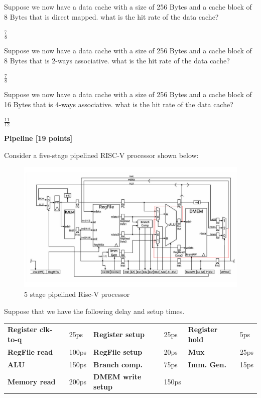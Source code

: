 \documentclass[addpoints, 12pt, answers]{exam}
\begin{document}
\begin{questions}
\begin{parts}
        Suppose we now have a data cache with a size of 256 Bytes and a cache block of 8 Bytes that is direct mapped. what is the hit rate of the data cache?


        \underline{$\frac{7}{8}$}

        Suppose we now have a data cache with a size of 256 Bytes and a cache block of 8 Bytes that is 2-ways associative. what is the hit rate of the data cache?


        \underline{$\frac{7}{8}$}


        Suppose we now have a data cache with a size of 256 Bytes and a cache block of 16 Bytes that is 4-ways associative. what is the hit rate of the data cache?

        \underline{$\frac{11}{12}$}




    \end{parts}

    \pagebreak


    \question \textbf{Pipeline [19 points]}

    Consider a five-stage pipelined RISC-V processor shown below:
    \begin{figure}[h]
        \centering
        \includegraphics[width=\linewidth]{pipeline.pdf}
        \caption*{5 stage pipelined Risc-V processor}
        \label{fig:pipelined}
    \end{figure}

    Suppose that we have the following delay and setup times.

    \begin{table}[h]
        \centering
        \begin{tabular}{l l l l l l}
            {\bf Register clk-to-q} & 25ps  & {\bf Register setup}   & 25ps  & {\bf Register hold} & 5ps  \\
            {\bf RegFile read}      & 100ps & {\bf RegFile setup}    & 20ps  & {\bf Mux}           & 25ps \\
            {\bf ALU}               & 150ps & {\bf Branch comp.}     & 75ps  & {\bf Imm. Gen.}     & 15ps \\
            {\bf Memory read}       & 200ps & {\bf DMEM write setup} & 150ps                              \\
        \end{tabular}
        \label{tab:delay_time}
    \end{table}


\end{questions}
\end{document}
